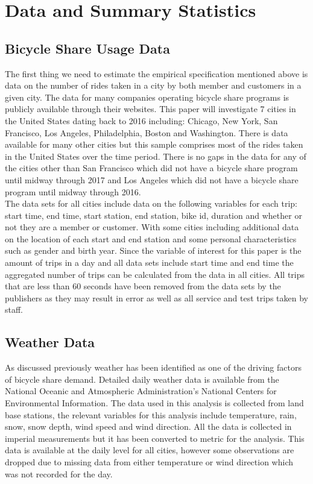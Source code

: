 \documentclass[12pt,letter paper]{article}
\begin{document}
\section{Data and Summary Statistics}

\subsection{Bicycle Share Usage Data}
The first thing we need to estimate the empirical specification mentioned above is data on the number of rides taken in a city by both member and customers in a given city.  The data for many companies operating bicycle share programs is publicly available through their websites.  This paper will investigate 7 cities in the United States dating back to 2016 including: Chicago, New York, San Francisco, Los Angeles, Philadelphia, Boston and Washington.  There is data available for many other cities but this sample comprises most of the rides taken in the United States over the time period.  There is no gaps in the data for any of the cities other than San Francisco which did not have a bicycle share program until midway through 2017 and Los Angeles which did not have a bicycle share program until midway through 2016.  \\

The data sets for all cities include data on the following variables for each trip: start time, end time, start station, end station, bike id, duration and whether or not they are a member or customer.  With some cities including additional data on the location of each start and end station and some personal characteristics such as gender and birth year.  Since the variable of interest for this paper is the amount of trips in a day and all data sets include start time and end time the aggregated number of trips can be calculated from the data in all cities.  All trips that are less than 60 seconds have been removed from the data sets by the publishers as they may result in error as well as all service and test trips taken by staff.

\subsection{Weather Data}
As discussed previously weather has been identified as one of the driving factors of bicycle share demand.  Detailed daily weather data is available from the National Oceanic and Atmospheric Administration's National Centers for Environmental Information.  The data used in this analysis is collected from land base stations, the relevant variables for this analysis include temperature, rain, snow, snow depth, wind speed and wind direction.  All the data is collected in imperial measurements but it has been converted to metric for the analysis.  This data is available at the daily level for all cities, however some observations are dropped due to missing data from either temperature or wind direction which was not recorded for the day.  
\end{document}
